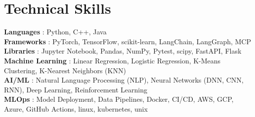 \documentclass[letterpaper,10pt]{article}
\begin{document}
\section{Technical Skills}
\begin{itemize}[leftmargin=0.15in, itemsep=0pt, label={}]
  \small{\item{
        \textbf{Languages }{: Python, C++, Java} \\
        \vspace{2pt}
        \textbf{Frameworks }{: PyTorch, TensorFlow, scikit-learn, LangChain, LangGraph, MCP } \\
        \vspace{2pt}
        \textbf{Libraries }{: Jupyter Notebook, Pandas, NumPy, Pytest, scipy, FastAPI, Flask } \\
        \vspace{2pt}
        \textbf{Machine Learning }{: Linear Regression,  Logistic Regression, K-Means Clustering, K-Nearest Neighbors (KNN)} \\
        \vspace{2pt}
        \textbf{AI/ML }{: Natural Language Processing (NLP), Neural Networks (DNN, CNN, RNN), Deep Learning, Reinforcement Learning} \\
        \vspace{2pt}
        \textbf{MLOps }{: Model Deployment, Data Pipelines, Docker, CI/CD, AWS, GCP, Azure, GitHub Actions, linux, kubernetes, unix}
        }}
\end{itemize}
\end{document}
